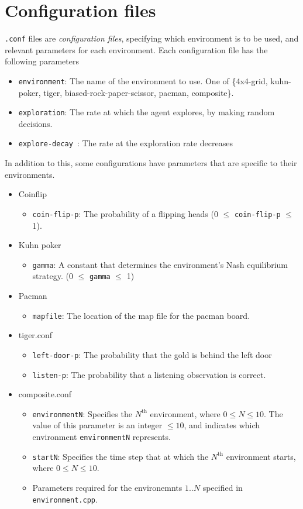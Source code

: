 \documentclass[pdftex,twoside,a4paper]{report}
\begin{document}
\section{Configuration files}
\texttt{.conf} files are \emph{configuration files}, specifying which environment is to be used, and relevant parameters for each environment. Each configuration file has the following parameters
\begin{itemize}
\item \texttt{environment}: The name of the environment to use. One of \{4x4-grid, kuhn-poker, tiger, biased-rock-paper-scissor, pacman, composite\}.
\item \texttt{exploration}: The rate at which the agent explores, by making random decisions.
\item \texttt{explore-decay }: The rate at the exploration rate decreases
\end{itemize}
In addition to this, some configurations have parameters that are specific to their environments.
\begin{itemize}
\item Coinflip
    \begin{itemize}
        \item \texttt{coin-flip-p}: The probability of a flipping heads (0 $\leq$ \texttt{coin-flip-p}  $\leq$ 1).
    \end{itemize}
\item Kuhn poker
    \begin{itemize}
        \item \texttt{gamma}: A constant that determines the environment's Nash equilibrium strategy. (0 $\leq$ \texttt{gamma}  $\leq$ 1)
    \end{itemize}
\item Pacman
    \begin{itemize}
        \item \texttt{mapfile}: The location of the map file for the pacman board.
    \end{itemize}
\item tiger.conf
    \begin{itemize}
        \item \texttt{left-door-p}: The probability that the gold is behind the left door
        \item \texttt{listen-p}: The probability that a listening observation is correct.
    \end{itemize}
\item composite.conf
    \begin{itemize}
        \item \texttt{environmentN}: Specifies the $N^{\text{th}}$ environment, where $0 \leq N \leq 10$. The value of this parameter is an integer $\leq 10$, and indicates which environment \texttt{environmentN} represents.
        \item \texttt{startN}: Specifies the time step that at which the $N^{\text{th}}$ environment starts, where $0 \leq N \leq 10$.
        \item Parameters required for the environemnts $1..N$ specified in \texttt{environment.cpp}.
    \end{itemize}
\end{itemize}
\end{document}
